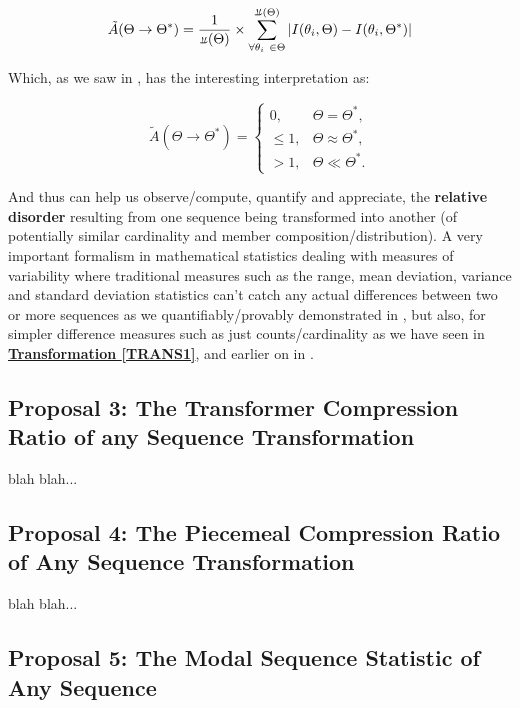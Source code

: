\documentclass[11pt,a4paper]{article}
\newcommand{\invpi}[1]{\mathop{\rotatebox[origin=c]{180}{$\pi$}}#1}
\begin{document}
\begin{equation}
\tilde{A}(\Theta \rightarrow \Theta^*) = \frac{1}{\invpi(\Theta)} \times \sum\limits_{\forall \theta_i \ \in \Theta}^{\invpi(\Theta)} | I(\theta_i,\Theta) - I(\theta_i,\Theta^*)|
\end{equation} 

Which, as we saw in \cite{adtpaper}, has the interesting interpretation as:


\begin{equation}
\label{EQTHET}
\tilde{A}(\Theta \rightarrow \Theta^*) = \begin{cases}
0, & \Theta = \Theta^*, \\
\leq 1, & \Theta \approx \Theta^*, \\
> 1, & \Theta \ll \Theta^*.
\end{cases}
\end{equation}

And thus can help us observe/compute, quantify and appreciate, the \textbf{relative disorder} resulting from one sequence being transformed into another (of potentially similar cardinality and member composition/distribution). A very important formalism in mathematical statistics dealing with measures of variability where traditional measures such as the range, mean deviation,
variance and standard deviation statistics can't catch any actual differences between two or more sequences as we quantifiably/provably demonstrated in \cite{transformatics}, but also, for simpler difference measures such as just counts/cardinality as we have seen in \textbf{\hyperref[TRANS1]{Transformation \ref{TRANS1}}}, and earlier on in \cite{lutalo_2025_trans_genetics}.


\subsection{Proposal 3: The Transformer Compression Ratio of any Sequence Transformation\cite{transformatics}}

blah blah...

\subsection{Proposal 4: The Piecemeal Compression Ratio of Any Sequence Transformation\cite{transformatics}}

blah blah...


\subsection{Proposal 5: The Modal Sequence Statistic of Any Sequence\cite{transformatics}}
\end{document}
